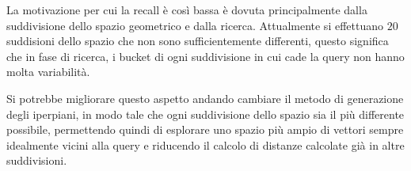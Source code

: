 La motivazione per cui la recall è così bassa è dovuta principalmente dalla suddivisione 
dello spazio geometrico e dalla ricerca. Attualmente si effettuano $20$ suddisioni
dello spazio che non sono sufficientemente differenti, questo significa che in 
fase di ricerca, i bucket di ogni suddivisione in cui cade la query non hanno molta 
variabilità.

Si potrebbe migliorare questo aspetto andando cambiare il metodo di generazione 
degli iperpiani, in modo tale che ogni suddivisione dello spazio sia il più differente 
possibile, permettendo quindi di esplorare uno spazio più ampio di vettori 
sempre idealmente vicini alla query e riducendo il calcolo di distanze 
calcolate già in altre suddivisioni. 
